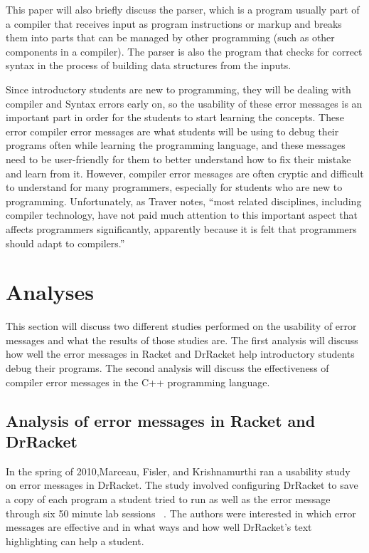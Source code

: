 \documentclass{sig-alternate}
\begin{document}
This paper will also briefly discuss the parser, which is a program usually part of a compiler that receives input as program instructions or markup and breaks them into parts that can be managed by other programming (such as other components in a compiler).
The parser is also the program that checks for correct syntax in the process of building data structures from the inputs. 

Since introductory students are new to programming, they will be dealing with compiler and Syntax errors early on, so the usability of these error messages is an important part in order for the students to start learning the concepts.
These error compiler error messages are what students will be using to debug their programs often while learning the programming language, and these messages need to be user-friendly for them to better understand how to fix their mistake and learn from it.
However, compiler error messages are often cryptic and difficult to understand for many programmers, especially for students who are new to programming. Unfortunately, as Traver notes, ``most related disciplines, including compiler technology, have not paid much attention to this important aspect that affects programmers significantly, apparently because it is felt that programmers should adapt to compilers.'' ~\cite{Traver:2010}


\section{Analyses}\label{analyses}
This section will discuss two different studies performed on the usability of error messages and what the results of those studies are.
The first analysis will discuss how well the error messages in Racket and DrRacket help introductory students debug their programs.
The second analysis will discuss the effectiveness of compiler error messages in the C++ programming language. 


\subsection{Analysis of error messages in Racket and DrRacket}
In the spring of 2010,Marceau, Fisler, and Krishnamurthi ran a usability study on error messages in DrRacket.
The study involved configuring DrRacket to save a copy of each program a student tried to run as well as the error message through six 50 minute lab sessions ~\cite{Marceau:2011:MEE:1953163.1953308}.
The authors were interested in which error messages are effective and in what ways and how well DrRacket's text highlighting can help a student.  
\end{document}
